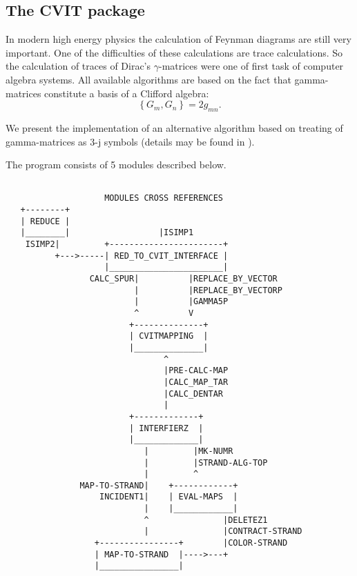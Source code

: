 
\subsection{The CVIT package}

In modern high energy physics the calculation of Feynman diagrams are
still very important. One of the difficulties of these calculations
are trace calculations. So the calculation of traces of Dirac's
$\gamma$-matrices were one of first task of computer algebra systems.
All available algorithms are based on the fact that gamma-matrices
constitute a basis of a Clifford algebra:
\[
  \left\{G_{m},G_{n}\right\} = 2g_{mn}.
\]

We present the implementation of an alternative algorithm based on
treating of gamma-matrices as 3-j symbols (details may be found in
\cite{Ilyin:89,Kennedy:1982}).

The program consists of 5 modules described below.

\newpage
\begin{verbatim}

                    MODULES CROSS REFERENCES
   +--------+
   | REDUCE |
   |________|                  |ISIMP1
    ISIMP2|         +-----------------------+
          +--->-----| RED_TO_CVIT_INTERFACE |
                    |_______________________|
                 CALC_SPUR|          |REPLACE_BY_VECTOR
                          |          |REPLACE_BY_VECTORP
                          |          |GAMMA5P
                          ^          V
                         +--------------+
                         | CVITMAPPING  |
                         |______________|
                                ^
                                |PRE-CALC-MAP
                                |CALC_MAP_TAR
                                |CALC_DENTAR
                                |
                         +-------------+
                         | INTERFIERZ  |
                         |_____________|
                            |         |MK-NUMR
                            |         |STRAND-ALG-TOP
                            |         ^
               MAP-TO-STRAND|    +------------+
                   INCIDENT1|    | EVAL-MAPS  |
                            |    |____________|
                            ^               |DELETEZ1
                            |               |CONTRACT-STRAND
                  +----------------+        |COLOR-STRAND
                  | MAP-TO-STRAND  |---->---+
                  |________________|


\end{verbatim}


